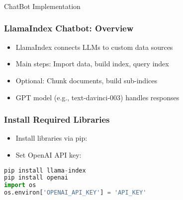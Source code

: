 \begin{frame}[fragile]\frametitle{}
\begin{center}
{\Large ChatBot Implementation}
\end{center}
\end{frame}






\begin{frame}[fragile]\frametitle{LlamaIndex Chatbot: Overview}
    \begin{itemize}
        \item LlamaIndex connects LLMs to custom data sources
        \item Main steps: Import data, build index, query index
        \item Optional: Chunk documents, build sub-indices
        \item GPT model (e.g., text-davinci-003) handles responses
    \end{itemize}
\end{frame}

\begin{frame}[fragile]\frametitle{Install Required Libraries}
    \begin{itemize}
        \item Install libraries via pip:
        \item Set OpenAI API key:
    \end{itemize}
\begin{lstlisting}[language=Python]
pip install llama-index
pip install openai
import os
os.environ['OPENAI_API_KEY'] = 'API_KEY'
\end{lstlisting}
\end{frame}

